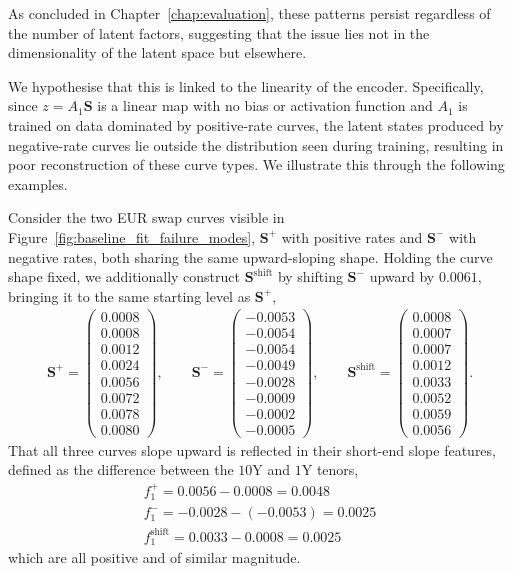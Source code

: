 As concluded in Chapter~\ref{chap:evaluation}, these patterns persist regardless of the number of latent factors, suggesting that the issue lies not in the dimensionality of the latent space but elsewhere. 

We hypothesise that this is linked to the linearity of the encoder. Specifically, since $z = A_1\mathbf{S}$ is a linear map with no bias or activation function and $A_1$ is trained on data dominated by positive-rate curves, the latent states produced by negative-rate curves lie outside the distribution seen during training, resulting in poor reconstruction of these curve types. We illustrate this through the following examples.

\begin{example}\label{ex:level}
Consider the two EUR swap curves visible in Figure~\ref{fig:baseline_fit_failure_modes}, $\mathbf{S}^{+}$ with positive rates and $\mathbf{S}^{-}$ with negative rates, both sharing the same upward-sloping 
shape. Holding the curve shape fixed, we additionally construct 
$\mathbf{S}^{\text{shift}}$ by shifting $\mathbf{S}^{-}$ upward by $0.0061$, bringing it to the same starting level as 
$\mathbf{S}^{+}$,
\begin{align*}
\mathbf{S}^{+} = \begin{pmatrix} 0.0008 \\ 0.0008 \\ 0.0012 \\ 0.0024 \\ 0.0056 \\ 
0.0072 \\ 0.0078 \\ 0.0080 \end{pmatrix}, \qquad
\mathbf{S}^{-} = \begin{pmatrix} -0.0053 \\ -0.0054 \\ -0.0054 \\ -0.0049 \\ 
-0.0028 \\ -0.0009 \\ -0.0002 \\ -0.0005 \end{pmatrix}, \qquad
\mathbf{S}^{\text{shift}} = \begin{pmatrix} 0.0008 \\ 0.0007 \\ 0.0007 \\ 0.0012 \\ 
0.0033 \\ 0.0052 \\ 0.0059 \\ 0.0056 \end{pmatrix}.
\end{align*}
That all three curves slope upward is reflected in their short-end slope features, 
defined as the difference between the $10$Y and $1$Y tenors,
\begin{align*}
    f_1^{+} = 0.0056 - 0.0008 = 0.0048\\
    f_1^{-} = -0.0028 - (-0.0053) = 0.0025\\
    f_1^{\text{shift}} = 0.0033 - 0.0008 = 0.0025
\end{align*}
which are all positive and of similar magnitude.


\end{example}
